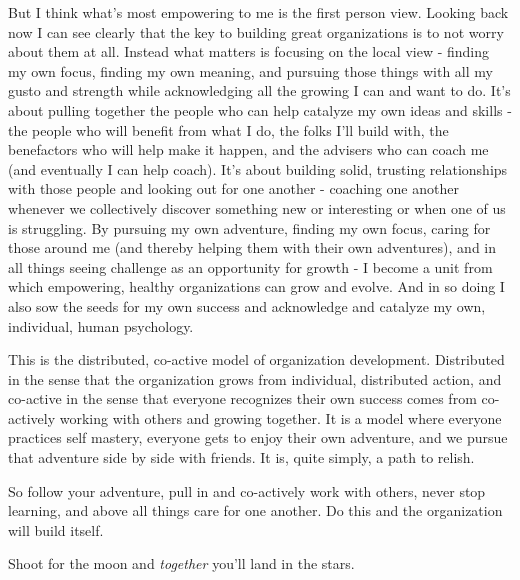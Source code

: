\documentclass[11pt]{book}
\begin{document}
But I think what's most empowering to me is the first person view. Looking back now I can see clearly that the key to building great organizations is to not worry about them at all. Instead what matters is focusing on the local view - finding my own focus, finding my own meaning, and pursuing those things with all my gusto and strength while acknowledging all the growing I can and want to do. It's about pulling together the people who can help catalyze my own ideas and skills - the people who will benefit from what I do, the folks I'll build with, the benefactors who will help make it happen, and the advisers who can coach me (and eventually I can help coach). It's about building solid, trusting relationships with those people and looking out for one another - coaching one another whenever we collectively discover something new or interesting or when one of us is struggling. By pursuing my own adventure, finding my own focus, caring for those around me (and thereby helping them with their own adventures), and in all things seeing challenge as an opportunity for growth - I become a unit from which empowering, healthy organizations can grow and evolve. And in so doing I also sow the seeds for my own success and acknowledge and catalyze my own, individual, human psychology. 
\newline

This is the distributed, co-active model of organization development. Distributed in the sense that the organization grows from individual, distributed action, and co-active in the sense that everyone recognizes their own success comes from co-actively working with others and growing together. It is a model where everyone practices self mastery, everyone gets to enjoy their own adventure, and we pursue that adventure side by side with friends. It is, quite simply, a path to relish.
\newline

So follow your adventure, pull in and co-actively work with others, never stop learning, and above all things care for one another. Do this and the organization will build itself.
\newline

Shoot for the moon and \textit{together} you'll land in the stars.



\end{document}
